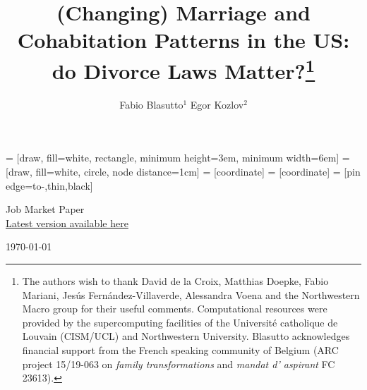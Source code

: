 \documentclass[12pt]{article}
\title{(Changing) Marriage and Cohabitation Patterns in the US: do Divorce Laws Matter?\thanks{The authors wish to thank David de la Croix, Matthias Doepke, Fabio Mariani, Jesús Fernández-Villaverde, Alessandra Voena and the Northwestern Macro group for their useful comments. Computational resources were provided by the supercomputing facilities of the Université catholique de Louvain (CISM/UCL) and Northwestern University. Blasutto acknowledges financial support from the French speaking community of Belgium (ARC project 15/19-063 on \textit{family transformations} and \textit{mandat d' aspirant} FC 23613).}}
\author{\large Fabio Blasutto$^1$ \quad Egor Kozlov$^2$}
\date{}
\numberwithin{table}{section}
\begin{document}
	 	 = [draw, fill=white, rectangle, 
	minimum height=3em, minimum width=6em]
	 = [draw, fill=white, circle, node distance=1cm]
	 = [coordinate]
	 = [coordinate]
	 = [pin edge={to-,thin,black}]
	
	
	
	
	\maketitle
	
\vspace{-2cm}
\begin{center}\large	
	Job Market Paper\\
	\href{https://drive.google.com/file/d/1utFkMPdUR5yb07oyJI7Vx1BJDLfYgMHi/view?usp=sharing}{Latest version available here}
\end{center}
\begin{center}\large
	\today
\end{center}



	
\end{document}
